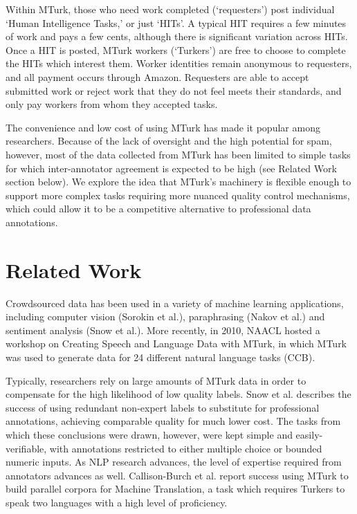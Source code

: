 \documentclass[11pt]{article}
\begin{document}
Within MTurk, those who need work completed (`requesters') post individual `Human Intelligence Tasks,' or just `HITs'. A typical HIT  requires a few minutes of work and pays a few cents, although there is significant variation across HITs. Once a HIT is posted, MTurk workers (`Turkers') are free to choose to complete the HITs which interest them. Worker identities remain anonymous to requesters, and all payment occurs through Amazon. Requesters are able to accept submitted work or reject work that they do not feel meets their standards, and only pay workers from whom they accepted tasks. 

The convenience and low cost of using MTurk has made it popular among researchers. Because of the lack of oversight and the high potential for spam, however, most of the data collected from MTurk has been limited to simple tasks for which inter-annotator agreement is expected to be high (see Related Work section below). We explore the idea that MTurk's machinery is flexible enough to support more complex tasks requiring more nuanced quality control mechanisms, which could allow it to be a competitive alternative to professional data annotations.

\section{Related Work}
Crowdsourced data has been used in a variety of machine learning applications, including computer vision (Sorokin et al.), paraphrasing (Nakov et al.) and sentiment analysis (Snow et al.). More recently, in 2010, NAACL hosted a workshop on Creating Speech and Language Data with MTurk, in which MTurk was used to generate data for 24 different natural language tasks (CCB).

Typically, researchers rely on large amounts of MTurk data in order to compensate for the high likelihood of low quality labels. Snow et al. describes the success of using redundant non-expert labels to substitute for professional annotations, achieving comparable quality for much lower cost. The tasks from which these conclusions were drawn, however, were kept simple and easily-verifiable, with annotations restricted to either multiple choice or bounded numeric inputs. As NLP research advances, the level of expertise required from annotators advances as well. Callison-Burch et al. report success using MTurk to build parallel corpora for Machine Translation, a task which requires Turkers to speak two languages with a high level of proficiency.
\end{document}
